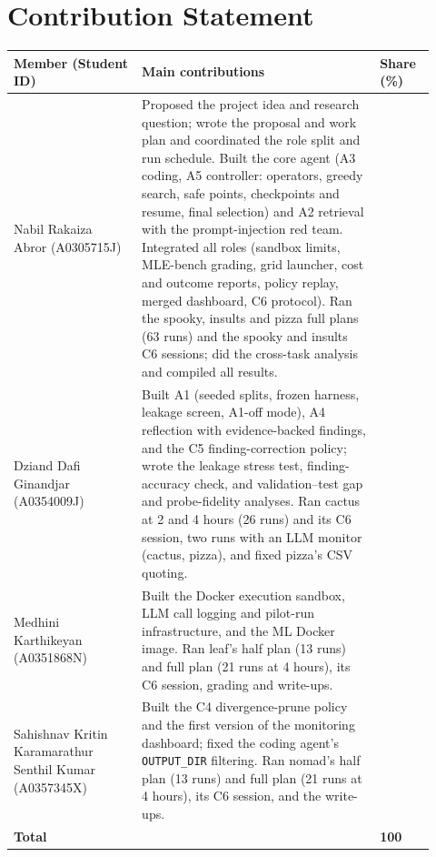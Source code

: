 \documentclass[11pt]{article}
\begin{document}
\clearpage

\section*{Contribution Statement}


\begin{center}
\small
\begin{tabular}{@{}>{\raggedright\arraybackslash}p{0.28\linewidth}
                >{\raggedright\arraybackslash}p{0.52\linewidth}
                >{\centering\arraybackslash}p{0.12\linewidth}@{}}
\toprule
\textbf{Member (Student ID)} & \textbf{Main contributions} & \textbf{Share (\%)} \\
\midrule
Nabil Rakaiza Abror (A0305715J) & Proposed the project idea and research question;
  wrote the proposal and work plan and coordinated the role split and run schedule.
  Built the core agent (A3 coding, A5 controller: operators, greedy search, safe points,
  checkpoints and resume, final selection) and A2 retrieval with the prompt-injection
  red team. Integrated all roles (sandbox limits, MLE-bench grading, grid launcher,
  cost and outcome reports, policy replay, merged dashboard, C6 protocol). Ran the
  spooky, insults and pizza full plans (63 runs) and the spooky and insults C6 sessions;
  did the cross-task analysis and compiled all results. & 50 \\
Dziand Dafi Ginandjar (A0354009J) & Built A1 (seeded splits, frozen harness, leakage
  screen, A1-off mode), A4 reflection with evidence-backed findings, and the C5
  finding-correction policy; wrote the leakage stress test, finding-accuracy check, and
  validation--test gap and probe-fidelity analyses. Ran cactus at 2 and 4 hours (26
  runs) and its C6 session, two runs with an LLM monitor (cactus, pizza), and fixed
  pizza's CSV quoting. & 20 \\
Medhini Karthikeyan (A0351868N) & Built the Docker execution sandbox, LLM call
  logging and pilot-run infrastructure, and the ML Docker image. Ran leaf's half plan
  (13 runs) and full plan (21 runs at 4 hours), its C6 session, grading and write-ups.
  & 15 \\
Sahishnav Kritin Karamarathur Senthil Kumar (A0357345X) & Built the C4
  divergence-prune policy and the first version of the monitoring dashboard; fixed the
  coding agent's \texttt{OUTPUT\_DIR} filtering. Ran nomad's half plan (13 runs) and
  full plan (21 runs at 4 hours), its C6 session, and the write-ups. & 15 \\
\midrule
\textbf{Total} & & \textbf{100} \\
\bottomrule
\end{tabular}
\end{center}
\end{document}
